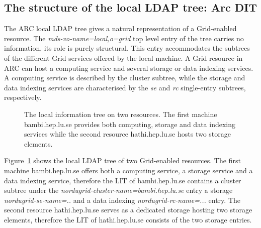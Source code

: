 \documentclass{article}
\begin{document}
\subsection{The structure of the local LDAP tree: Arc DIT}


The ARC local LDAP tree gives a natural representation 
of a Grid-enabled resource. 
The {\it mds-vo-name=local,o=grid} top level entry of the tree
carries no information, its role is purely structural. This entry
accommodates the subtrees of the different Grid services offered by the 
local machine. A Grid resource in ARC can host a computing service 
and several storage or data indexing services. A computing service is 
described by the cluster subtree, while the storage and data indexing services 
are characterised by the {\it se} and {\it rc} single-entry subtrees, respectively.

%

\begin{figure}[hb]
\centering
{ {} }
\caption{\label{fig:dit} The local information tree on two resources. 
The first machine bambi.hep.lu.se provides both computing, storage and data indexing services
while the second resource hathi.hep.lu.se hosts two storage elements.}
\end{figure} 

Figure~\ref{fig:dit} shows the local LDAP tree of two Grid-enabled resources.
The first machine bambi.hep.lu.se offers both a computing service,
a storage service and a data indexing service, therefore the LIT of bambi.hep.lu.se
contains a cluster subtree under the {\it nordugrid-cluster-name=bambi.hep.lu.se} entry 
a storage {\it nordugrid-se-name=..} and a data indexing {\it nordugrid-rc-name=...}
entry. The second resource hathi.hep.lu.se serves as a dedicated storage hosting two storage
elements, therefore the LIT of hathi.hep.lu.se consists of the two storage entries. 
\end{document}
